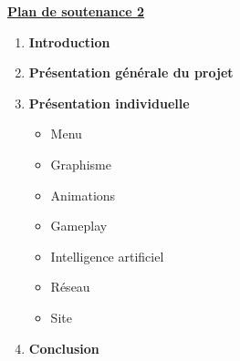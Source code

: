 \documentclass[a4paper, 12pt]{article}
\begin{document}
\begin{center}
\Huge{\bf{\underline{Plan de soutenance 2}}}
\end{center}
\begin{enumerate}

\Large \item {\bf{Introduction}}
\item \Large{\bf{Présentation générale du projet }}
\begin{itemize}
\end{itemize}
\item \Large{\bf{Présentation individuelle}}
\begin{large}
\begin{itemize}
\item Menu
\item Graphisme
\item Animations
\item Gameplay
\item Intelligence artificiel
\item Réseau
\item Site
\end{itemize}
\end{large}
\item \Large{\bf{Conclusion}}
\begin{itemize}
\end{itemize}
\end{enumerate}
\end{document}
